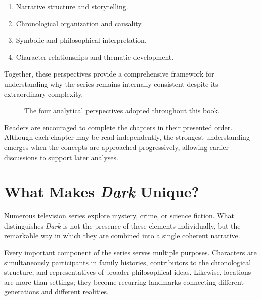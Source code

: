 \documentclass[12pt,oneside,openany]{book}
\begin{document}
\begin{enumerate}
\item Narrative structure and storytelling.
\item Chronological organization and causality.
\item Symbolic and philosophical interpretation.
\item Character relationships and thematic development.
\end{enumerate}

Together, these perspectives provide a comprehensive framework for understanding why the series remains internally consistent despite its extraordinary complexity.

\begin{figure}[H]
\centering
{}
\caption{The four analytical perspectives adopted throughout this book.}
\end{figure}

\begin{tcolorbox}[colback=blue!4,colframe=blue!60!black,title=Reading Strategy]
Readers are encouraged to complete the chapters in their presented order. Although each chapter may be read independently, the strongest understanding emerges when the concepts are approached progressively, allowing earlier discussions to support later analyses.
\end{tcolorbox}
\section{What Makes \textit{Dark} Unique?}

Numerous television series explore mystery, crime, or science fiction.
What distinguishes \textit{Dark} is not the presence of these elements
individually, but the remarkable way in which they are combined into a
single coherent narrative.

Every important component of the series serves multiple purposes.
Characters are simultaneously participants in family histories,
contributors to the chronological structure, and representatives of
broader philosophical ideas. Likewise, locations are more than settings;
they become recurring landmarks connecting different generations and
different realities.
\end{document}
